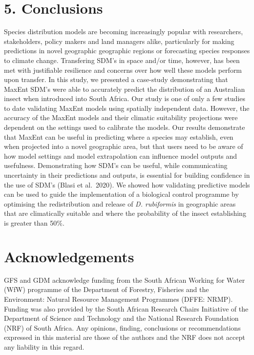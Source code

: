 \documentclass[12pt,]{article}
\begin{document}
\hypertarget{conclusions}{%
\section{5. Conclusions}\label{conclusions}}

Species distribution models are becoming increasingly popular with
researchers, stakeholders, policy makers and land managers alike,
particularly for making predictions in novel geographic geographic
regions or forecasting species responses to climate change. Transfering
SDM's in space and/or time, however, has been met with justifiable
resilience and concerns over how well these models perform upon
transfer. In this study, we presented a case-study demonstrating that
MaxEnt SDM's were able to accurately predict the distribution of an
Australian insect when introduced into South Africa. Our study is one of
only a few studies to date validating MaxEnt models using spatially
independent data. However, the accuracy of the MaxEnt models and their
climatic suitability projections were dependent on the settings used to
calibrate the models. Our results demonstrate that MaxEnt can be useful
in predicting where a species may establish, even when projected into a
novel geographic area, but that users need to be aware of how model
settings and model extrapolation can influence model outputs and
usefulness. Demonstrating how SDM's can be useful, while communicating
uncertainty in their predictions and outputs, is essential for building
confidence in the use of SDM's (Blasi et al.~2020). We showed how
validating predictive models can be used to guide the implementation of
a biological control programme by optimising the redistribution and
release of \emph{D. rubiformis} in geographic areas that are
climatically suitable and where the probability of the insect
establishing is greater than 50\%.

\hypertarget{acknowledgements}{%
\section{Acknowledgements}\label{acknowledgements}}

GFS and GDM acknowledge funding from the South African Working for Water
(WfW) programme of the Department of Forestry, Fisheries and the
Environment: Natural Resource Management Programmes (DFFE: NRMP).
Funding was also provided by the South African Research Chairs
Initiative of the Department of Science and Technology and the National
Research Foundation (NRF) of South Africa. Any opinions, finding,
conclusions or recommendations expressed in this material are those of
the authors and the NRF does not accept any liability in this regard.
\end{document}
